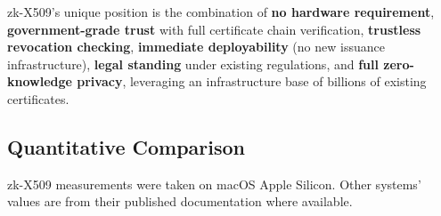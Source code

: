 \documentclass[11pt, a4paper]{article}
\begin{document}
zk-X509's unique position is the combination of \textbf{no hardware
requirement}, \textbf{government-grade trust} with full certificate
chain verification, \textbf{trustless revocation checking},
\textbf{immediate deployability} (no new issuance infrastructure),
\textbf{legal standing} under existing regulations, and \textbf{full
zero-knowledge privacy}, leveraging an infrastructure base of billions
of existing certificates.

\subsection{Quantitative
Comparison}\label{quantitative-comparison}

zk-X509 measurements were taken on macOS Apple Silicon. Other systems'
values are from their published documentation where available.
\end{document}
